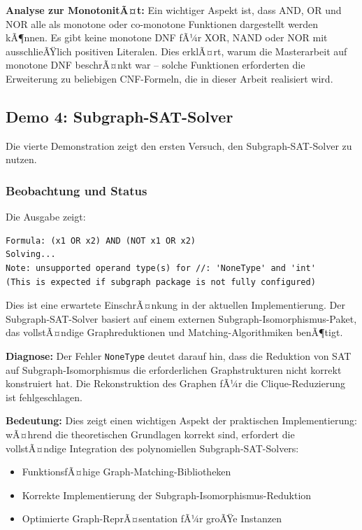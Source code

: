 ﻿\documentclass[a4paper,12pt]{article}
\theoremstyle{definition}
\begin{document}
\textbf{Analyse zur MonotonitÃ¤t:} Ein wichtiger Aspekt ist, dass AND, OR und NOR alle als monotone oder co-monotone Funktionen dargestellt werden kÃ¶nnen. Es gibt keine monotone DNF fÃ¼r XOR, NAND oder NOR mit ausschlieÃŸlich positiven Literalen. Dies erklÃ¤rt, warum die Masterarbeit \cite{Epp13} auf monotone DNF beschrÃ¤nkt war -- solche Funktionen erforderten die Erweiterung zu beliebigen CNF-Formeln, die in dieser Arbeit realisiert wird.

\subsection{Demo 4: Subgraph-SAT-Solver}

Die vierte Demonstration zeigt den ersten Versuch, den Subgraph-SAT-Solver zu nutzen.

\subsubsection{Beobachtung und Status}

Die Ausgabe zeigt:
\begin{lstlisting}
Formula: (x1 OR x2) AND (NOT x1 OR x2)
Solving...
Note: unsupported operand type(s) for //: 'NoneType' and 'int'
(This is expected if subgraph package is not fully configured)
\end{lstlisting}

Dies ist eine erwartete EinschrÃ¤nkung in der aktuellen Implementierung. Der Subgraph-SAT-Solver basiert auf einem externen Subgraph-Isomorphismus-Paket, das vollstÃ¤ndige Graphreduktionen und Matching-Algorithmiken benÃ¶tigt. 

\textbf{Diagnose:} Der Fehler \texttt{NoneType} deutet darauf hin, dass die Reduktion von SAT auf Subgraph-Isomorphismus die erforderlichen Graphstrukturen nicht korrekt konstruiert hat. Die Rekonstruktion des Graphen fÃ¼r die Clique-Reduzierung ist fehlgeschlagen.

\textbf{Bedeutung:} Dies zeigt einen wichtigen Aspekt der praktischen Implementierung: wÃ¤hrend die theoretischen Grundlagen korrekt sind, erfordert die vollstÃ¤ndige Integration des polynomiellen Subgraph-SAT-Solvers:
\begin{itemize}
    \item FunktionsfÃ¤hige Graph-Matching-Bibliotheken
    \item Korrekte Implementierung der Subgraph-Isomorphismus-Reduktion
    \item Optimierte Graph-ReprÃ¤sentation fÃ¼r groÃŸe Instanzen
\end{itemize}
\end{document}
